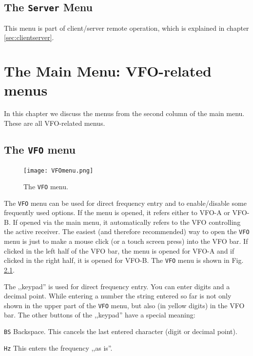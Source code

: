 \documentclass[12pt]{book}
\def\rett#1{\texttt{\color{red}#1}}
\def\bltt#1{\texttt{\color{blue}#1}}
\begin{document}
\section{The \texttt{Server} Menu}
This menu is part of client/server remote operation, which is explained in chapter \ref{sec:clientserver}.
\chapter[VFO-related menus]{The Main Menu: VFO-related menus}

In this chapter we discuss the menus from the second column
of the main menu. These are all VFO-related menus.


\section{The \texttt{VFO}  menu}
\label{sec:vfomenu}

\begin{figure}[ht]
\center
\texttt{[image: VFOmenu.png]}
\caption{The \bltt{VFO} menu.}
\label{fig:VFOmenu}
\end{figure}

The \bltt{VFO} menu can be used for direct frequency entry and to
enable/disable some frequently used options. If the menu is opened,
it refers either to VFO-A or VFO-B. If opened via the main menu,
it automatically refers to the VFO controlling the active receiver.
The easiest (and therefore recommended) way to open the \bltt{VFO}
menu is just to make a mouse click (or a touch screen press) into the
VFO bar. If clicked in the left half of the VFO bar, the menu is opened
for VFO-A and if clicked in the right half, it is opened for VFO-B.
The \bltt{VFO} menu is shown in Fig. \ref{fig:VFOmenu}.


The ,,keypad'' is used for direct frequency entry. You can enter
digits and a decimal point. While entering a number the string
entered so far is not only shown in the upper part of the
\bltt{VFO} menu, but also (in yellow digits) in the VFO bar.
The other buttons of the ,,keypad'' have a special meaning:



\rett{BS} Backspace. This cancels the last entered character
(digit or decimal point).

\rett{Hz} This enters the frequency ,,as is''.
\end{document}
